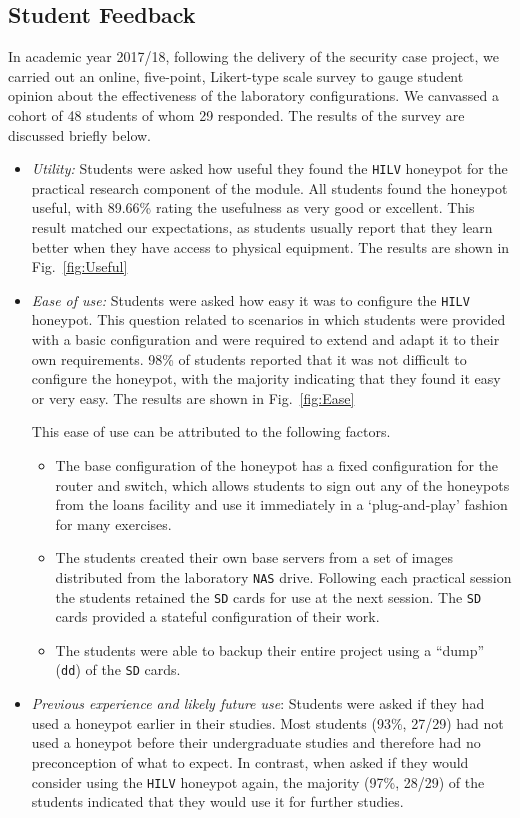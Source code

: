 \documentclass{ieeeaccess}
\begin{document}
\subsection{Student Feedback}\label{sec:Feedback}
In academic year 2017/18, following the delivery of the security case project,
we carried out an online, five-point, Likert-type scale survey to gauge student
opinion about the effectiveness of the laboratory configurations. We canvassed
a cohort of 48 students of whom 29 responded. The results of the survey are
discussed briefly below.
\begin{itemize}
  \item \noindent\emph{Utility:} Students were asked how useful they found the
\texttt{HILV} honeypot for the practical research component of the module. All
students found the honeypot useful, with 89.66\% rating the usefulness as very
good or excellent. This result matched our expectations, as students usually
report that they learn better when they have access to physical equipment. 
The results are shown in Fig.~\ref{fig:Useful}
  \item \noindent\emph{Ease of use:} Students were asked how easy it was to
configure the \texttt{HILV} honeypot. This question related to scenarios in
which students were provided with a basic configuration and were required to
extend and adapt it to their own requirements. 98\% of students reported that
it was not difficult to configure the honeypot, with the majority indicating
that they found it easy or very easy. The results are shown in Fig.~\ref{fig:Ease}
\par\noindent This ease of use can be attributed to the following factors.
  \begin{itemize} 
    \item The base configuration of the honeypot has a fixed configuration for
      the router and switch, which allows students to sign out any of the
      honeypots from the loans facility and use it immediately in a
      `plug-and-play' fashion for many exercises.  
    \item The students created their own base servers from a set of images
      distributed from the laboratory \texttt{NAS} drive.  Following each
      practical session the students retained the \texttt{SD} cards for use at
      the next session. The \texttt{SD} cards provided a stateful configuration
      of their work.  
    \item The students were able to backup their entire project using a ``dump''
      (\texttt{dd}) of the \texttt{SD} cards.
  \end{itemize}
  \item \noindent\emph{Previous experience and likely future use}: Students
were asked if they had used a honeypot earlier in their studies. Most students
(93\%, 27/29) had not used a honeypot before their undergraduate studies and
therefore had no preconception of what to expect. In contrast, when asked if
they would consider using the \texttt{HILV} honeypot again, the majority
(97\%, 28/29) of the students indicated that they would use it for further studies. 
\end{itemize}
\end{document}

